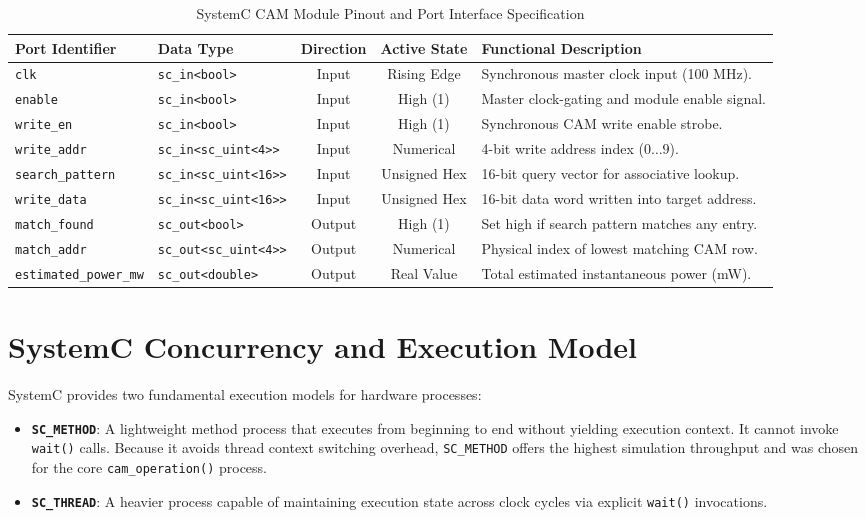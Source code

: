\documentclass[11pt,a4paper,oneside]{report}
\begin{document}
\begin{table}[h!]
\centering
\caption{SystemC CAM Module Pinout and Port Interface Specification}
\label{tab:port_list}
\begin{tabularx}{\textwidth}{llccX}
\toprule
\textbf{Port Identifier} & \textbf{Data Type} & \textbf{Direction} & \textbf{Active State} & \textbf{Functional Description} \\
\midrule
\texttt{clk} & \texttt{sc\_in<bool>} & Input & Rising Edge & Synchronous master clock input (100 MHz). \\
\texttt{enable} & \texttt{sc\_in<bool>} & Input & High (1) & Master clock-gating and module enable signal. \\
\texttt{write\_en} & \texttt{sc\_in<bool>} & Input & High (1) & Synchronous CAM write enable strobe. \\
\texttt{write\_addr} & \texttt{sc\_in<sc\_uint<4>>} & Input & Numerical & 4-bit write address index ($0 \dots 9$). \\
\texttt{search\_pattern} & \texttt{sc\_in<sc\_uint<16>>} & Input & Unsigned Hex & 16-bit query vector for associative lookup. \\
\texttt{write\_data} & \texttt{sc\_in<sc\_uint<16>>} & Input & Unsigned Hex & 16-bit data word written into target address. \\
\texttt{match\_found} & \texttt{sc\_out<bool>} & Output & High (1) & Set high if search pattern matches any entry. \\
\texttt{match\_addr} & \texttt{sc\_out<sc\_uint<4>>} & Output & Numerical & Physical index of lowest matching CAM row. \\
\texttt{estimated\_power\_mw} & \texttt{sc\_out<double>} & Output & Real Value & Total estimated instantaneous power (mW). \\
\bottomrule
\end{tabularx}
\end{table}

\section{SystemC Concurrency and Execution Model}
SystemC provides two fundamental execution models for hardware processes:
\begin{itemize}[leftmargin=*]
    \item \textbf{\texttt{SC\_METHOD}}: A lightweight method process that executes from beginning to end without yielding execution context. It cannot invoke \texttt{wait()} calls. Because it avoids thread context switching overhead, \texttt{SC\_METHOD} offers the highest simulation throughput and was chosen for the core \texttt{cam\_operation()} process.
    \item \textbf{\texttt{SC\_THREAD}}: A heavier process capable of maintaining execution state across clock cycles via explicit \texttt{wait()} invocations.
\end{itemize}
\end{document}
